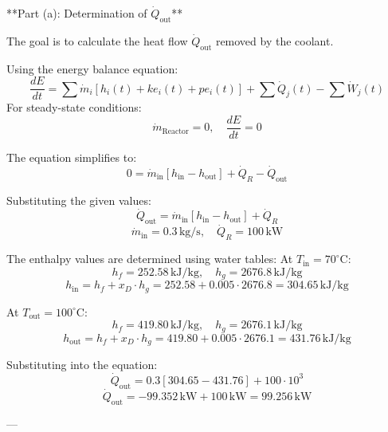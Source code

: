 **Part (a): Determination of \( \dot{Q}_{\text{out}} \)**  

The goal is to calculate the heat flow \( \dot{Q}_{\text{out}} \) removed by the coolant.  

Using the energy balance equation:  
\[
\frac{dE}{dt} = \sum \dot{m}_i \left[ h_i(t) + ke_i(t) + pe_i(t) \right] + \sum \dot{Q}_j(t) - \sum \dot{W}_j(t)
\]  
For steady-state conditions:  
\[
\dot{m}_{\text{Reactor}} = 0, \quad \frac{dE}{dt} = 0
\]  

The equation simplifies to:  
\[
0 = \dot{m}_{\text{in}} \left[ h_{\text{in}} - h_{\text{out}} \right] + \dot{Q}_R - \dot{Q}_{\text{out}}
\]  

Substituting the given values:  
\[
\dot{Q}_{\text{out}} = \dot{m}_{\text{in}} \left[ h_{\text{in}} - h_{\text{out}} \right] + \dot{Q}_R
\]  
\[
\dot{m}_{\text{in}} = 0.3 \, \text{kg/s}, \quad \dot{Q}_R = 100 \, \text{kW}
\]  

The enthalpy values are determined using water tables:  
At \( T_{\text{in}} = 70^\circ\text{C} \):  
\[
h_f = 252.58 \, \text{kJ/kg}, \quad h_g = 2676.8 \, \text{kJ/kg}
\]  
\[
h_{\text{in}} = h_f + x_D \cdot h_g = 252.58 + 0.005 \cdot 2676.8 = 304.65 \, \text{kJ/kg}
\]  

At \( T_{\text{out}} = 100^\circ\text{C} \):  
\[
h_f = 419.80 \, \text{kJ/kg}, \quad h_g = 2676.1 \, \text{kJ/kg}
\]  
\[
h_{\text{out}} = h_f + x_D \cdot h_g = 419.80 + 0.005 \cdot 2676.1 = 431.76 \, \text{kJ/kg}
\]  

Substituting into the equation:  
\[
\dot{Q}_{\text{out}} = 0.3 \left[ 304.65 - 431.76 \right] + 100 \cdot 10^3
\]  
\[
\dot{Q}_{\text{out}} = -99.352 \, \text{kW} + 100 \, \text{kW} = 99.256 \, \text{kW}
\]  

---
